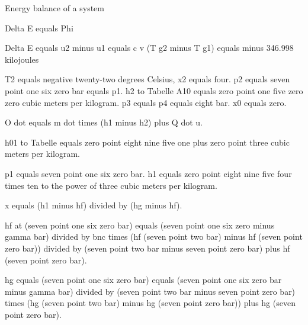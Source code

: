Energy balance of a system

Delta E equals Phi

Delta E equals u2 minus u1 equals c v (T g2 minus T g1) equals minus 346.998 kilojoules

T2 equals negative twenty-two degrees Celsius, x2 equals four.  
p2 equals seven point one six zero bar equals p1.  
h2 to Tabelle A10 equals zero point one five zero zero cubic meters per kilogram.  
p3 equals p4 equals eight bar.  
x0 equals zero.  

O dot equals m dot times (h1 minus h2) plus Q dot u.  

h01 to Tabelle equals zero point eight nine five one plus zero point three cubic meters per kilogram.  

p1 equals seven point one six zero bar.  
h1 equals zero point eight nine five four times ten to the power of three cubic meters per kilogram.  

x equals (h1 minus hf) divided by (hg minus hf).  

hf at (seven point one six zero bar) equals (seven point one six zero minus gamma bar) divided by bnc times (hf (seven point two bar) minus hf (seven point zero bar)) divided by (seven point two bar minus seven point zero bar) plus hf (seven point zero bar).  

hg equals (seven point one six zero bar) equals (seven point one six zero bar minus gamma bar) divided by (seven point two bar minus seven point zero bar) times (hg (seven point two bar) minus hg (seven point zero bar)) plus hg (seven point zero bar).